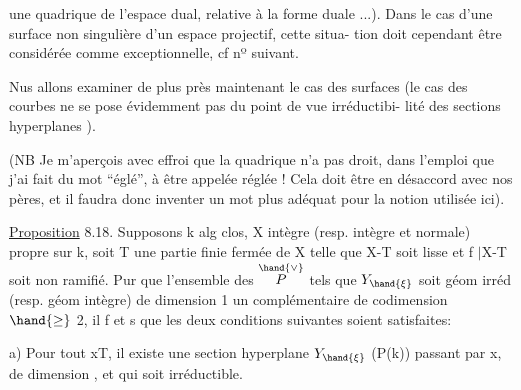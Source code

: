 une quadrique de l'espace dual, relative à la forme duale ...).   Dans le
cas d'une surface non singulière  d'un espace projectif, cette situa-%
tion doit cependant être considérée comme exceptionnelle, cf nº suivant.


Nus allons examiner de plus près   maintenant le cas des surfaces
(le cas des courbes ne se pose évidemment pas du point de vue irréductibi-%
lité des sections hyperplanes  ).

(NB  Je m'aperçois avec effroi que la quadrique n'a pas droit, dans
l'emploi que j'ai fait du mot ``églé'', à être appelée réglée !  Cela doit
être en désaccord avec nos pères, et il faudra donc inventer un mot plus
adéquat pour la notion utilisée ici).

\uline{Proposition} 8.18.  Supposons  k alg clos, X 
 intègre (resp. intègre et normale)
propre sur k, soit T une partie finie fermée de X telle que  X-T soit
lisse  et f $|$X-T  soit non ramifié.  Pur que l'ensemble des \hand{$\xi \in$} $\overset{\hand{\vee}}{P}$  tels
que  $Y_{\hand{\xi}}$  soit  géom irréd   (resp.  géom intègre)  de dimension  1
  un complémentaire de  codimension $\hand{\geq}$ 2, il f et s que les deux
conditions suivantes soient satisfaites:

a)  Pour tout x\hand{$\in$}T, il existe une section hyperplane $Y_{\hand{\xi}}$   (\hand{$\xi \in$}P(k))
passant par x, de dimension , et qui soit irréductible.

